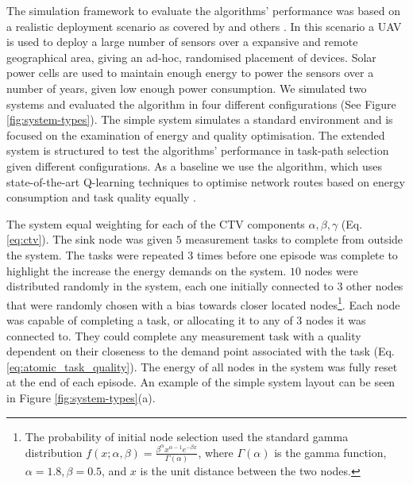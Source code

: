 The simulation framework to evaluate the algorithms' performance was based on a realistic deployment scenario as covered by  \cite{Gomez2015} and others \citep{Jha2016, Avram}. In this scenario a UAV is used to deploy a large number of sensors over a expansive and remote geographical area, giving an ad-hoc, randomised placement of devices. Solar power cells are used to maintain enough energy to power the sensors over a number of years, given low enough power consumption. We simulated two systems and evaluated the algorithm in four different configurations (See Figure \ref{fig:system-types}).  The simple system simulates a standard environment and is focused on the examination of energy and quality optimisation. The extended system is structured to test the algorithms' performance in task-path selection given different configurations.  As a baseline we use the \acronymQRouting{}{} algorithm, which uses state-of-the-art Q-learning techniques to optimise network routes based on energy consumption and task quality equally \citep{XXX, XXX}.

The \simulationSimple{}{} system  equal weighting for each of the CTV components $\alpha, \beta, \gamma$ (Eq. \ref{eq:ctv}). The sink node was given $5$ measurement tasks to complete from outside the system. The tasks were repeated $3$ times before one episode was complete to highlight the increase the energy demands on the system. $10$ nodes were distributed randomly in the system, each one initially connected to $3$ other nodes that were randomly chosen with a bias towards closer located nodes\footnote{
	The probability of initial node selection used the standard gamma distribution $f(x; \alpha, \beta) = \frac{\beta^{\alpha} x^{\alpha-1}e^{- \beta x}}   {\Gamma(\alpha)}$, where $\Gamma(\alpha)$ is the  gamma function, $\alpha=1.8, \beta=0.5$, and $x$ is the unit distance between the two nodes.
}.  Each node was capable of completing a task, or allocating it to any of $3$ nodes it was connected to. They could complete any measurement task with a quality dependent on their closeness to the demand point associated with the task (Eq. \ref{eq:atomic_task_quality}). The energy of all nodes in the system was fully reset at the end of each episode. An example of the simple system layout can be seen in Figure \ref{fig:system-types}(a). 
